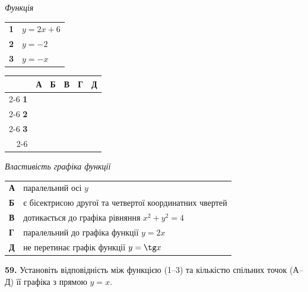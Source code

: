 \documentclass[14pt]{extarticle}
\newcommand{\answerGrid}{
    \begingroup
    \renewcommand{\arraystretch}{1.3} 
    \setlength{\tabcolsep}{7pt} 
    \begin{tabular}{r|c|c|c|c|c|}
         \multicolumn{1}{c}{} & \multicolumn{1}{c}{\textbf{А}} & \multicolumn{1}{c}{\textbf{Б}} & \multicolumn{1}{c}{\textbf{В}} & \multicolumn{1}{c}{\textbf{Г}} & \multicolumn{1}{c}{\textbf{Д}} \\ \cline{2-6}
         \textbf{1} & & & & & \\ \cline{2-6}
         \textbf{2} & & & & & \\ \cline{2-6}
         \textbf{3} & & & & & \\ \cline{2-6}
    \end{tabular}
    \endgroup
}
\begin{document}
\noindent
\begin{minipage}[t]{0.45\textwidth}
    \textit{Функція} \par \vspace{0.2cm}
    \begin{tabular}{@{}p{0.5cm} l@{}}
    \textbf{1} & $y=2x+6$ \\[0.4cm]
    \textbf{2} & $y=-2$ \\[0.4cm]
    \textbf{3} & $y=-x$ \\
    \end{tabular}

    \vspace{1.0cm}
    \answerGrid
\end{minipage}%
\hfill
\begin{minipage}[t]{0.50\textwidth}
    \textit{Властивість графіка функції} \par \vspace{0.2cm}
    \begin{tabular}{@{}p{0.5cm} p{7cm}@{}}
    \textbf{А} & паралельний осі $y$ \\[0.2cm]
    \textbf{Б} & є бісектрисою другої та четвертої координатних чвертей \\[0.2cm]
    \textbf{В} & дотикається до графіка рівняння $x^2+y^2=4$ \\[0.2cm]
    \textbf{Г} & паралельний до графіка функції $y=2x$ \\[0.2cm]
    \textbf{Д} & не перетинає графік функції $y=\tg x$ \\
    \end{tabular}
\end{minipage}

\vspace{0.7cm}

\noindent\textbf{59.} Установіть відповідність між функцією (1--3) та кількістю спільних точок (А--Д) її графіка з прямою $y=x$.

\vspace{0.3cm}
\end{document}
